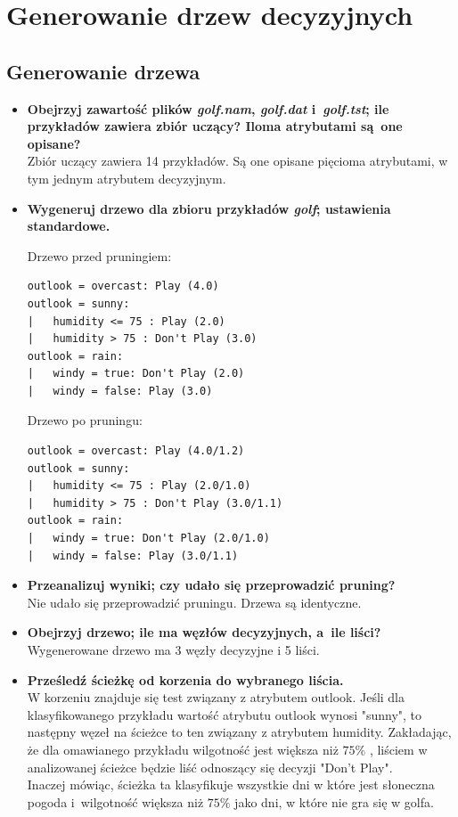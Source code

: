 
\section{Generowanie drzew decyzyjnych}

\subsection{Generowanie drzewa}

\begin{itemize}
\item \textbf{Obejrzyj zawartość plików \emph{golf.nam}, \emph{golf.dat} i~\emph{golf.tst}; ile przykładów zawiera zbiór uczący? Iloma atrybutami są~one opisane?}
\\Zbiór uczący zawiera 14 przykładów. Są one opisane pięcioma atrybutami, w tym jednym atrybutem decyzyjnym.

\item \textbf{Wygeneruj drzewo dla zbioru przykładów \emph{golf}; ustawienia standardowe.}

Drzewo przed pruningiem:	 
	\begin{verbatim}
outlook = overcast: Play (4.0)
outlook = sunny:
|   humidity <= 75 : Play (2.0)
|   humidity > 75 : Don't Play (3.0)
outlook = rain:
|   windy = true: Don't Play (2.0)
|   windy = false: Play (3.0)
	\end{verbatim}
	
Drzewo po pruningu:
	\begin{verbatim}
outlook = overcast: Play (4.0/1.2)
outlook = sunny:
|   humidity <= 75 : Play (2.0/1.0)
|   humidity > 75 : Don't Play (3.0/1.1)
outlook = rain:
|   windy = true: Don't Play (2.0/1.0)
|   windy = false: Play (3.0/1.1)
	\end{verbatim}





\item \textbf{Przeanalizuj wyniki; czy udało się przeprowadzić pruning?}
\\Nie udało się przeprowadzić pruningu. Drzewa są identyczne.

\item \textbf{Obejrzyj drzewo; ile ma węzłów decyzyjnych, a~ile liści?}
\\Wygenerowane drzewo ma 3 węzły decyzyjne i 5 liści.

\item \textbf{ Prześledź ścieżkę od korzenia do wybranego liścia.}
	\\W korzeniu znajduje się test związany z atrybutem outlook. Jeśli dla klasyfikowanego przykładu wartość atrybutu outlook wynosi "sunny", to następny węzeł na ścieżce to ten związany z atrybutem humidity. Zakładając, że dla omawianego przykładu wilgotność jest większa niż $ 75\% $ , liściem w analizowanej ścieżce będzie liść odnoszący się decyzji "Don't Play".
	\\Inaczej mówiąc, ścieżka ta klasyfikuje wszystkie dni w które jest słoneczna pogoda i~wilgotność większa niż $ 75\% $ jako dni, w które nie gra się w golfa.
		

\end{itemize}
